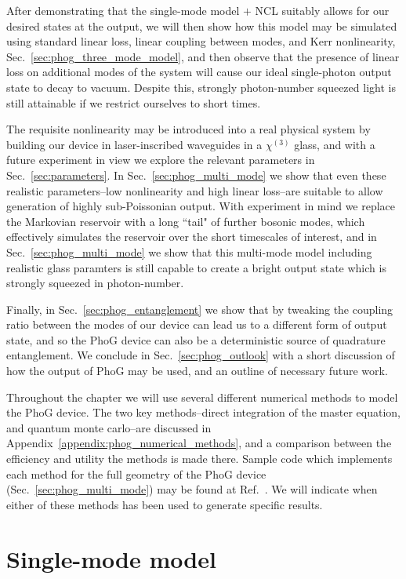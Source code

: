After demonstrating that the single-mode model $+$ NCL suitably allows for our desired states at the output, we will then show how this model may be simulated using standard linear loss, linear coupling between modes, and Kerr nonlinearity, Sec.~\ref{sec:phog_three_mode_model}, and then observe that the presence of linear loss on additional modes of the system will cause our ideal single-photon output state to decay to vacuum. Despite this, strongly photon-number squeezed light is still attainable if we restrict ourselves to short times. 

The requisite nonlinearity may be introduced into a real physical system by building our device in laser-inscribed waveguides in a $\chi^{\left(3\right)}$ glass, and with a future experiment in view we explore the relevant parameters in Sec.~\ref{sec:parameters}. In Sec.~\ref{sec:phog_multi_mode} we show that even these realistic parameters--low nonlinearity and high linear loss--are suitable to allow generation of highly sub-Poissonian output. With experiment in mind we replace the Markovian reservoir with a long ``tail" of further bosonic modes, which effectively simulates the reservoir over the short timescales of interest, and in Sec.~\ref{sec:phog_multi_mode} we show that this multi-mode model including realistic glass paramters is still capable to create a bright output state which is strongly squeezed in photon-number.

Finally, in Sec.~\ref{sec:phog_entanglement} we show that by tweaking the coupling ratio between the modes of our device can lead us to a different form of output state, and so the PhoG device can also be a deterministic source of quadrature entanglement. We conclude in Sec.~\ref{sec:phog_outlook} with a short discussion of how the output of PhoG may be used, and an outline of necessary future work.

Throughout the chapter we will use several different numerical methods to model the PhoG device. The two key methods--direct integration of the master equation, and quantum monte carlo--are discussed in Appendix~\ref{appendix:phog_numerical_methods}, and a comparison between the efficiency and utility the methods is made there. Sample code which implements each method for the full geometry of the PhoG device (Sec.~\ref{sec:phog_multi_mode}) may be found at Ref.~\cite{phog_code}. We will indicate when either of these methods has been used to generate specific results.


\section{Single-mode model}\label{sec:phog_single_mode_model}

